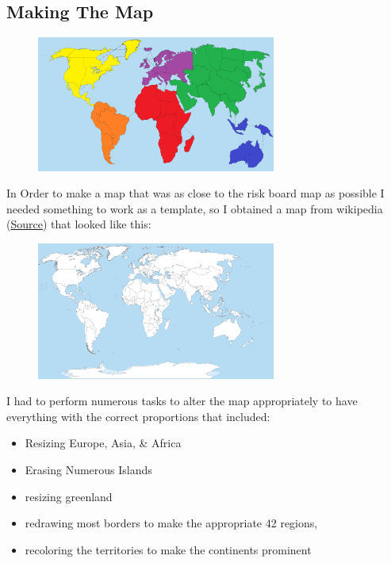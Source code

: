 \documentclass{article}
\begin{document}
	\subsection{Making The Map}
	\begin{figure}[h!]
		\centering
		\includegraphics[width=0.7\textwidth]{final1.png}
	\end{figure}
	In Order to make a map that was as close to the risk board map as possible I needed something to work as a template, so I obtained a map from wikipedia (\href{https://upload.wikimedia.org/wikipedia/commons/c/cf/A_large_blank_world_map_with_oceans_marked_in_blue.PNG}{Source}) that looked like this:\\
	\begin{figure}[h!]
		\centering
		\includegraphics[width=0.7\textwidth]{worldmap.png}
	\end{figure}
	I had to perform numerous tasks to alter the map appropriately to have everything with the correct proportions that included:
	\begin{itemize}
		\item Resizing Europe, Asia, \& Africa
		\item Erasing Numerous Islands
		\item resizing greenland
		\item redrawing most borders to make the appropriate 42 regions,
		\item recoloring the territories to make the continents prominent
	\end{itemize}
\end{document}

